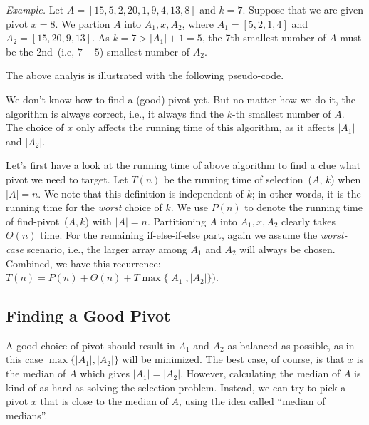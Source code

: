 \emph{Example.} Let $A = [15, 5, 2, 20, 1, 9, 4, 13, 8]$ and $k = 7$.
Suppose that we are given pivot $x = 8$. We partion $A$ into $A_1, x, A_2$,
where $A_1 = [5, 2, 1, 4]$ and $A_2 = [15, 20, 9, 13]$.
As $k = 7 > |A_1| + 1 = 5$, the 7th smallest number of $A$
must be the 2nd~(i.e, $7-5$) smallest number of $A_2$.

The above analyis is illustrated with the following pseudo-code.

\begin{minipage}{0.8\textwidth}
	\xxx
	\aab {\textcolor{blue}{$x$ = find-pivot~($A$)};}\xxx
	\xxx
	\xxx
	\xxx
	\xxx
	\xxx
\end{minipage}

We don't know how to find a (good) pivot yet.
But no matter how we do it, the algorithm is always correct, i.e., it always find the $k$-th smallest number of $A$.
The choice of $x$ only affects the running time of this algorithm, as it affects $|A_1|$ and $|A_2|$.


Let's first have a look at the running time
of above algorithm to find a clue what pivot we need to target.
Let $T(n)$ be the running time of selection~($A$, $k$) when $|A| = n$. We note that this definition is independent of $k$;
in other words, it is the running time for the \emph{worst} choice of $k$.
We use $P(n)$ to denote the running time of find-pivot~($A,k$) with $|A| = n$.
Partitioning $A$ into $A_1,x,A_2$ clearly takes $\Theta(n)$ time.
For the remaining if-else-if-else part, again we assume the \emph{worst-case} scenario, i.e.,
the larger array among $A_1$ and $A_2$ will always be chosen.
Combined, we have this recurrence: $T(n) = P(n) + \Theta(n) + T\max\{|A_1|, |A_2|\})$.

\subsection*{Finding a Good Pivot}

A good choice of pivot should result in $A_1$ and $A_2$ as balanced as possible, as in this case 
$\max\{|A_1|, |A_2|\}$ will be minimized. %
The best case, of course, is that $x$ is the median of $A$ which gives $|A_1| = |A_2|$. 
However, calculating the median of $A$ is kind of as hard as solving the selection problem.
Instead, we can try to pick a pivot $x$ that is close to the median of $A$, using the idea called ``median of medians''.

